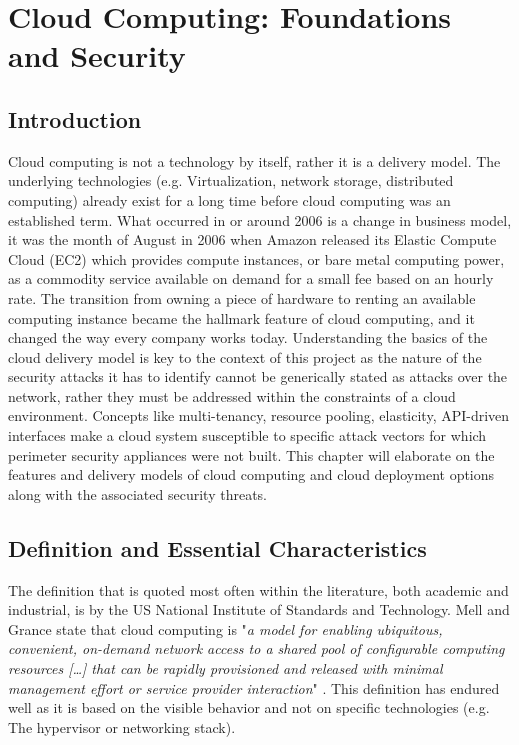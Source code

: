
\chapter{Cloud Computing: Foundations and Security}
\label{chap:cloud}

\section{Introduction}
\label{sec:cloud_intro}

Cloud computing is not a technology by itself, rather it is a delivery model. The underlying technologies (e.g. Virtualization, network storage, distributed computing) already exist for a long time before cloud computing was an established term. What occurred in or around 2006 is a change in business model, it was the month of August in 2006 when Amazon released its Elastic Compute Cloud (EC2) which provides compute instances, or bare metal computing power, as a commodity service available on demand for a small fee based on an hourly rate\cite{aws_ec2_announcement2006}. The transition from owning a piece of hardware to renting an available computing instance became the hallmark feature of cloud computing, and it changed the way every company works today.
Understanding the basics of the cloud delivery model is key to the context of this project as the nature of the security attacks it has to identify cannot be generically stated as attacks over the network, rather they must be addressed within the constraints of a cloud environment. Concepts like multi-tenancy, resource pooling, elasticity, API-driven interfaces make a cloud system susceptible to specific attack vectors for which perimeter security appliances were not built.
This chapter will elaborate on the features and delivery models of cloud computing and cloud deployment options along with the associated security threats.

\section{Definition and Essential Characteristics}
\label{sec:cloud_def}

The definition that is quoted most often within the literature, both academic and industrial, is by the US National Institute of Standards and Technology. Mell and Grance state that cloud computing is "\textit{a model for enabling ubiquitous, convenient, on-demand network access to a shared pool of configurable computing resources [\ldots] that can be rapidly provisioned and released with minimal management effort or service provider interaction}" \cite{mell2011nist}. This definition has endured well as it is based on the visible behavior and not on specific technologies (e.g. The hypervisor or networking stack).


